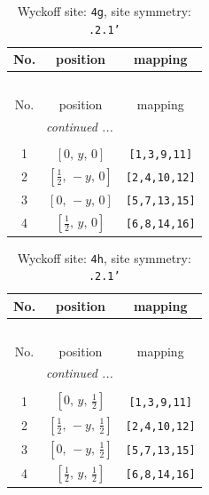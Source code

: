 \documentclass[fleqn,8pt]{jsarticle}
\begin{document}
\begin{longtable}{ccc}
\caption{Wyckoff site: {\tt 4g}, site symmetry: {\tt .2.1'}}
 \\
 \hline \hline
No. & position & mapping \\ \hline \endfirsthead

\multicolumn{2}{l}{\tablename\ \thetable{}} \\
 \hline \hline
No. & position & mapping \\ \hline \endhead

 \hline \hline
\multicolumn{2}{r}{\footnotesize\it continued ...} \\ \endfoot

 \hline \hline
\multicolumn{2}{r}{} \\ \endlastfoot

1 & $\left[ 0,\, y,\, 0 \right]$ & {\tt [1,3,9,11]} \\ \hline
2 & $\left[ \frac{1}{2},\, - y,\, 0 \right]$ & {\tt [2,4,10,12]} \\ \hline
3 & $\left[ 0,\, - y,\, 0 \right]$ & {\tt [5,7,13,15]} \\ \hline
4 & $\left[ \frac{1}{2},\, y,\, 0 \right]$ & {\tt [6,8,14,16]} \\
\end{longtable}
\renewcommand{\arraystretch}{1.2}
\begin{longtable}{ccc}
\caption{Wyckoff site: {\tt 4h}, site symmetry: {\tt .2.1'}}
 \\
 \hline \hline
No. & position & mapping \\ \hline \endfirsthead

\multicolumn{2}{l}{\tablename\ \thetable{}} \\
 \hline \hline
No. & position & mapping \\ \hline \endhead

 \hline \hline
\multicolumn{2}{r}{\footnotesize\it continued ...} \\ \endfoot

 \hline \hline
\multicolumn{2}{r}{} \\ \endlastfoot

1 & $\left[ 0,\, y,\, \frac{1}{2} \right]$ & {\tt [1,3,9,11]} \\ \hline
2 & $\left[ \frac{1}{2},\, - y,\, \frac{1}{2} \right]$ & {\tt [2,4,10,12]} \\ \hline
3 & $\left[ 0,\, - y,\, \frac{1}{2} \right]$ & {\tt [5,7,13,15]} \\ \hline
4 & $\left[ \frac{1}{2},\, y,\, \frac{1}{2} \right]$ & {\tt [6,8,14,16]} \\
\end{longtable}
\end{document}
